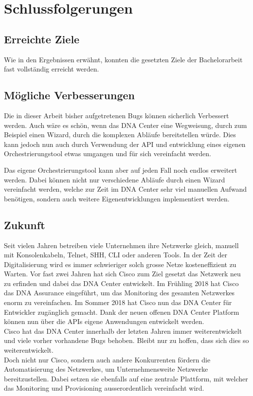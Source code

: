 \section{Schlussfolgerungen}

\subsection{Erreichte Ziele}
Wie in den Ergebnissen erwähnt, konnten die gesetzten Ziele der Bachelorarbeit fast vollständig erreicht werden. 
 
 
\subsection{Mögliche Verbesserungen}
Die in dieser Arbeit bisher aufgetretenen Bugs können sicherlich Verbessert werden. Auch wäre es schön, wenn das DNA Center eine Wegweisung, durch zum Beispiel einen Wizard, durch die komplexen Abläufe bereitstellen würde. Dies kann jedoch nun auch durch Verwendung der API und entwicklung eines eigenen Orchestrierungstool etwas umgangen und für sich vereinfacht werden.


Das eigene Orchestrierungstool kann aber auf jeden Fall noch endlos erweitert werden. Dabei können nicht nur verschiedene Abläufe durch einen Wizard vereinfacht werden, welche zur Zeit im DNA Center sehr viel manuellen Aufwand benötigen, sondern auch weitere Eigenentwicklungen implementiert werden.


 \subsection{Zukunft}
Seit vielen Jahren betreiben viele Unternehmen ihre Netzwerke gleich, manuell mit Konsolenkabeln, Telnet, SHH, CLI oder anderen Tools. In der Zeit der Digitalisierung wird es immer schwieriger solch grosse Netze kosteneffizient zu Warten. Vor fast zwei Jahren hat sich Cisco zum Ziel gesetzt das Netzwerk neu zu erfinden und dabei das DNA Center entwickelt. Im Frühling 2018 hat Cisco das DNA Assurance eingeführt, um das Monitoring des gesamten Netzwerkes enorm zu vereinfachen. Im Sommer 2018 hat Cisco nun das DNA Center für Entwickler zugänglich gemacht. Dank der neuen offenen DNA Center Platform können nun über die APIs eigene Anwendungen entwickelt werden.\\

Cisco hat das DNA Center innerhalb der letzten Jahren immer weiterentwickelt und viele vorher vorhandene Bugs behoben. Bleibt nur zu hoffen, dass sich dies so weiterentwickelt. \\

Doch nicht nur Cisco, sondern auch andere Konkurrenten fördern die Automatisierung des Netzwerkes, um Unternehmensweite Netzwerke bereitzustellen. Dabei setzen sie ebenfalls auf eine zentrale Plattform, mit welcher das Monitoring und Provisioning ausserordentlich vereinfacht wird.
